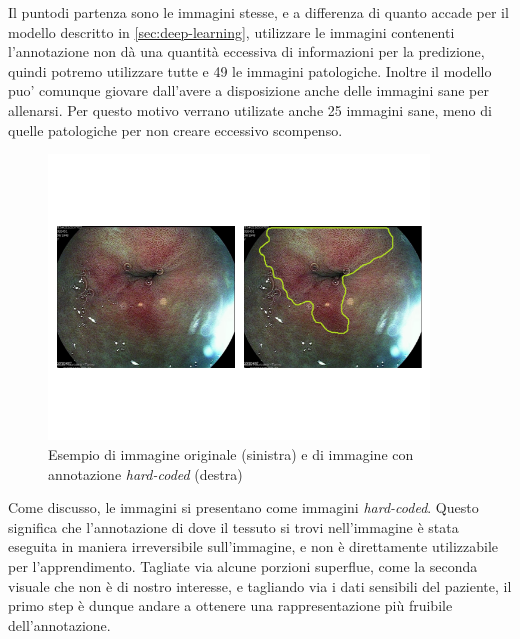 Il puntodi partenza sono le immagini stesse, e a differenza di
quanto accade per il modello descritto in \ref{sec:deep-learning},
utilizzare le immagini contenenti l'annotazione non dà una
quantità eccessiva di informazioni per la predizione, quindi
potremo utilizzare tutte e 49 le immagini patologiche.
Inoltre il modello puo' comunque giovare dall'avere a disposizione
anche delle immagini sane per allenarsi. Per questo motivo verrano
utilizate anche 25 immagini sane, meno di quelle patologiche per
non creare eccessivo scompenso.

\begin{figure}
    \includegraphics[width=0.9\textwidth]{./assets/side-by-side.png}
    \caption{\label{fig:side-by-side}Esempio di immagine originale (sinistra) e
    di immagine con annotazione {\it hard-coded} (destra)}
\end{figure}

Come discusso, le immagini si presentano come immagini {\it hard-coded}.
Questo significa che l'annotazione di dove il tessuto si trovi
nell'immagine è stata eseguita in maniera irreversibile sull'immagine,
e non è direttamente utilizzabile per l'apprendimento.
Tagliate via alcune porzioni superflue, come la seconda visuale che
non è di nostro interesse, e tagliando via i dati sensibili del paziente,
il primo step è dunque andare a ottenere una rappresentazione più
fruibile dell'annotazione.


